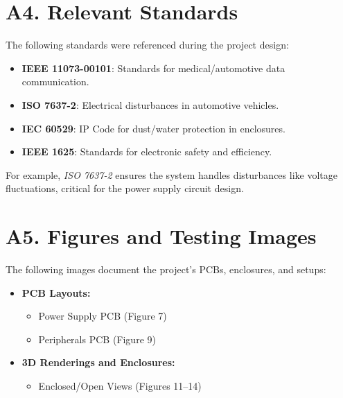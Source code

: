 \documentclass[12pt]{article}
\begin{document}
\section*{A4. Relevant Standards}
The following standards were referenced during the project design:
\begin{itemize}
    \item \textbf{IEEE 11073-00101}: Standards for medical/automotive data communication.
    \item \textbf{ISO 7637-2}: Electrical disturbances in automotive vehicles.
    \item \textbf{IEC 60529}: IP Code for dust/water protection in enclosures.
    \item \textbf{IEEE 1625}: Standards for electronic safety and efficiency.
\end{itemize}
For example, \textit{ISO 7637-2} ensures the system handles disturbances like voltage fluctuations, critical for the power supply circuit design.

\section*{A5. Figures and Testing Images}
The following images document the project's PCBs, enclosures, and setups:
\begin{itemize}
    \item \textbf{PCB Layouts:}
    \begin{itemize}
        \item Power Supply PCB (Figure 7)
        \item Peripherals PCB (Figure 9)
    \end{itemize}
    \item \textbf{3D Renderings and Enclosures:}
    \begin{itemize}
        \item Enclosed/Open Views (Figures 11–14)
    \end{itemize}
\end{itemize}
\end{document}
